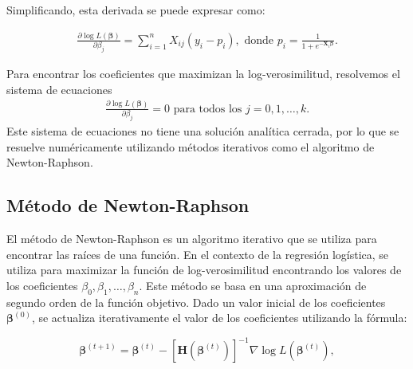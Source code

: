 \documentclass[12pt]{article}
\begin{document}
Simplificando, esta derivada se puede expresar como:

\begin{eqnarray*}%
\frac{\partial \log L(\boldsymbol{\beta})}{\partial \beta_j} = \sum_{i=1}^{n} X_{ij} (y_i - p_i),\textrm{ donde }p_i = \frac{1}{1 + e^{-\mathbf{X}_i \boldsymbol{\beta}}}.
\end{eqnarray*}

Para encontrar los coeficientes que maximizan la log-verosimilitud, resolvemos el sistema de ecuaciones 
\begin{eqnarray*}
\frac{\partial \log L(\boldsymbol{\beta})}{\partial \beta_j} = 0 \textrm{ para todos los }j = 0, 1, \ldots, k. 
\end{eqnarray*}
Este sistema de ecuaciones no tiene una solución analítica cerrada, por lo que se resuelve numéricamente utilizando métodos iterativos como el algoritmo de Newton-Raphson.

\subsection{Método de Newton-Raphson}

El método de Newton-Raphson es un algoritmo iterativo que se utiliza para encontrar las raíces de una función. En el contexto de la regresión logística, se utiliza para maximizar la función de log-verosimilitud encontrando los valores de los coeficientes $\beta_0, \beta_1, \ldots, \beta_n$. Este m\'etodo se basa en una aproximación de segundo orden de la función objetivo. Dado un valor inicial de los coeficientes $\boldsymbol{\beta}^{(0)}$, se actualiza iterativamente el valor de los coeficientes utilizando la fórmula:

\begin{equation*}%
\boldsymbol{\beta}^{(t+1)} = \boldsymbol{\beta}^{(t)} - \left[ \mathbf{H}(\boldsymbol{\beta}^{(t)}) \right]^{-1} \nabla \log L(\boldsymbol{\beta}^{(t)}),
\end{equation*}
\end{document}
